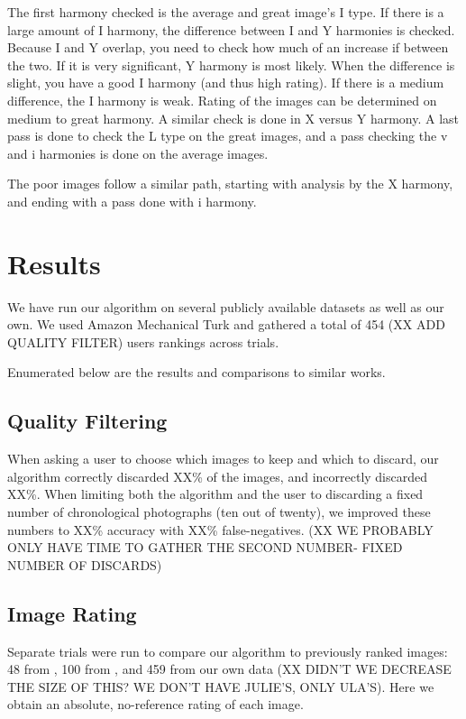 \documentclass[10pt,twocolumn,letterpaper]{article}
\begin{document}
The first harmony checked is the average and great image's I type. If there is a large amount of I harmony, the difference between I and Y harmonies is checked. Because I and Y overlap, you need to check how much of an increase if between the two. If it is very significant, Y harmony is most likely. When the difference is slight, you have a good I harmony (and thus high rating). If there is a medium difference, the I harmony is weak. Rating of the images can be determined on medium to great harmony. A similar check is done in X versus Y harmony. A last pass is done to check the L type on the great images, and a pass checking the v and i harmonies is done on the average images.

The poor images follow a similar path, starting with analysis by the X harmony, and ending with a pass done with i harmony.

\section{Results}
We have run our algorithm on several publicly available datasets as well as our own. We used Amazon Mechanical Turk and gathered a total of 454 (XX  ADD QUALITY FILTER) users rankings across trials.

Enumerated below are the results and comparisons to similar works.

\subsection{Quality Filtering} When asking a user to choose which images to keep and which to discard, our algorithm correctly discarded XX\% of the images, and incorrectly discarded XX\%. When limiting both the algorithm and the user to discarding a fixed number of chronological photographs (ten out of twenty), we improved these numbers to XX\% accuracy with XX\% false-negatives. (XX WE PROBABLY ONLY HAVE TIME TO GATHER THE SECOND NUMBER- FIXED NUMBER OF DISCARDS)

\subsection{Image Rating} Separate trials were run to compare our algorithm to previously ranked images: 48 from \cite{1640788}, 100 from \cite{springerlink:10.1007/978-3-540-88690-7_29}, and 459 from our own data (XX DIDN'T WE DECREASE THE SIZE OF THIS? WE DON'T HAVE JULIE'S, ONLY ULA'S). Here we obtain an absolute, no-reference rating of each image.
\end{document}
